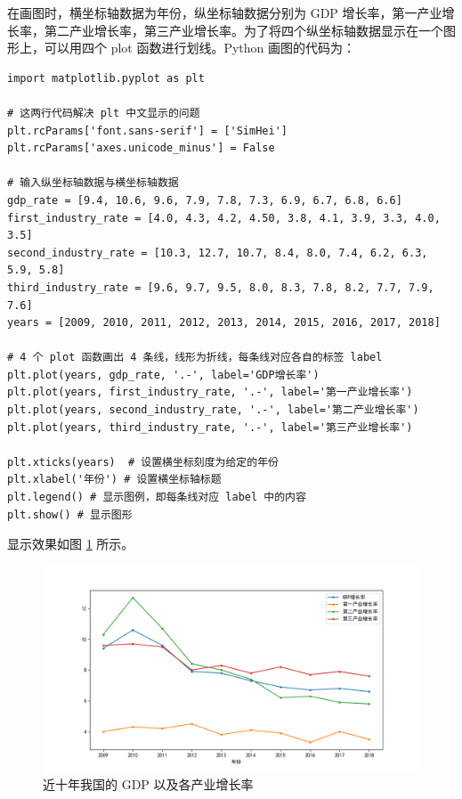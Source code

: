 在画图时，横坐标轴数据为年份，纵坐标轴数据分别为 GDP 增长率，第一产业增长率，第二产业增长率，第三产业增长率。为了将四个纵坐标轴数据显示在一个图形上，可以用四个 plot 函数进行划线。Python 画图的代码为：

\begin{lstlisting}[Language = Python]
import matplotlib.pyplot as plt

# 这两行代码解决 plt 中文显示的问题
plt.rcParams['font.sans-serif'] = ['SimHei']
plt.rcParams['axes.unicode_minus'] = False

# 输入纵坐标轴数据与横坐标轴数据
gdp_rate = [9.4, 10.6, 9.6, 7.9, 7.8, 7.3, 6.9, 6.7, 6.8, 6.6]
first_industry_rate = [4.0, 4.3, 4.2, 4.50, 3.8, 4.1, 3.9, 3.3, 4.0, 3.5]
second_industry_rate = [10.3, 12.7, 10.7, 8.4, 8.0, 7.4, 6.2, 6.3, 5.9, 5.8]
third_industry_rate = [9.6, 9.7, 9.5, 8.0, 8.3, 7.8, 8.2, 7.7, 7.9, 7.6]
years = [2009, 2010, 2011, 2012, 2013, 2014, 2015, 2016, 2017, 2018]

# 4 个 plot 函数画出 4 条线，线形为折线，每条线对应各自的标签 label
plt.plot(years, gdp_rate, '.-', label='GDP增长率')
plt.plot(years, first_industry_rate, '.-', label='第一产业增长率')
plt.plot(years, second_industry_rate, '.-', label='第二产业增长率')
plt.plot(years, third_industry_rate, '.-', label='第三产业增长率')

plt.xticks(years)  # 设置横坐标刻度为给定的年份
plt.xlabel('年份') # 设置横坐标轴标题
plt.legend() # 显示图例，即每条线对应 label 中的内容
plt.show() # 显示图形
\end{lstlisting}

显示效果如图 \ref{fig:gdp} 所示。

\begin{figure}[!ht]
\centering
  \includegraphics[width=\textwidth]{figure/gdp.png}
  \caption{近十年我国的 GDP 以及各产业增长率}\label{fig:gdp}
\end{figure}

